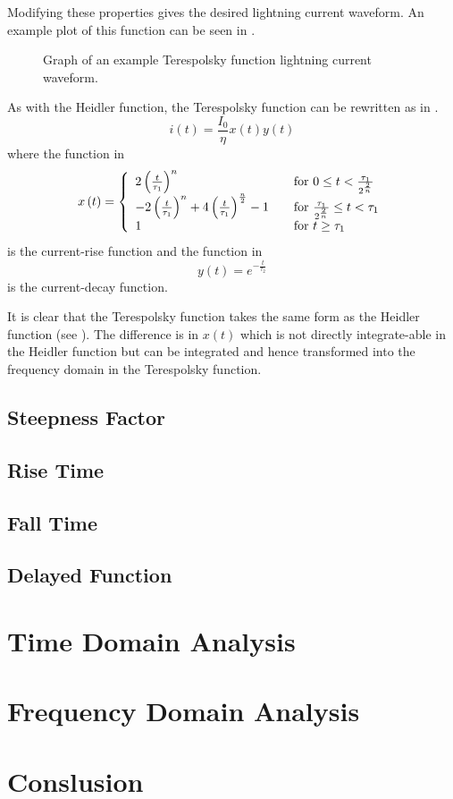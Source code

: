 Modifying these properties gives the desired lightning current waveform. An example plot of this function can be seen in .
\begin{figure}[]
	\centering
	
	\caption{Graph of an example Terespolsky function lightning current waveform.}
	\label{fig:TeresFuncEX}
\end{figure}
As with the Heidler function, the Terespolsky function can be rewritten as in .
\begin{equation}
i(t) = \frac{I_0}{\eta} x \left( t \right) y \left( t \right)
\label{eqn:TFSmall}
\end{equation}
where the function in 
\begin{equation}
	x \left( t \right) = \left\{
	  \begin{array}{l l}
	    2 \left( \frac{t}{\tau_1} \right )^n & \quad \textrm{for $0 \leq t < \frac{\tau_1}{2^{\frac{2}{n}}}$} \\
	    -2 \left( \frac{t}{\tau_1} \right )^n +4 \left( \frac{t}{\tau_1} \right )^{\frac{n}{2}} -1 & \quad \textrm{for $\frac{\tau_1}{2^{\frac{2}{n}}} \leq t < \tau_1$} \\
	    1 & \quad \textrm{for $t \geq \tau_1$}
	  \end{array} \right.
	\label{eqn:TFrise}
\end{equation}
is the current-rise function and the function in 
\begin{equation}
	y \left( t \right) = e^{-\frac{t}{\tau_2}}
	\label{eqn:TFfall}
\end{equation}
is the current-decay function.

It is clear that the Terespolsky function takes the same form as the Heidler function (see ). The difference is in $x \left( t \right)$ which is not directly integrate-able in the Heidler function but can be integrated and hence transformed into the frequency domain in the Terespolsky function.

\subsection{Steepness Factor}


\subsection{Rise Time}


\subsection{Fall Time}


\subsection{Delayed Function}


\section{Time Domain Analysis}


\section{Frequency Domain Analysis}


\section{Conslusion}